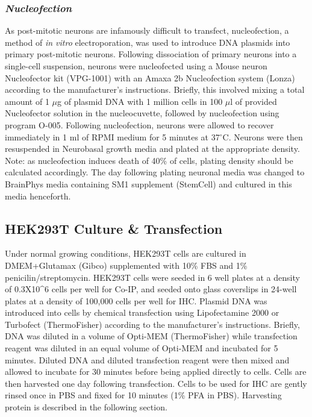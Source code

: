 \documentclass[onehalf,12pt]{beavtex}
\begin{document}
  \subsubsection*{\texorpdfstring{\emph{Nucleofection}}{Nucleofection}}\label{nucleofection}
  
  As post-mitotic neurons are infamously difficult to transfect,
  nucleofection, a method of \emph{in vitro} electroporation, was used to
  introduce DNA plasmids into primary post-mitotic neurons. Following
  dissociation of primary neurons into a single-cell suspension, neurons
  were nucleofected using a Mouse neuron Nucleofector kit (VPG-1001) with
  an Amaxa 2b Nucleofection system (Lonza) according to the manufacturer's
  instructions. Briefly, this involved mixing a total amount of 1 \(\mu\)g
  of plasmid DNA with 1 million cells in 100 \(\mu\)l of provided
  Nucleofector solution in the nucleocuvette, followed by nucleofection
  using program O-005. Following nucleofection, neurons were allowed to
  recover immediately in 1 ml of RPMI medium for 5 minutes at
  37\(^\circ\)C. Neurons were then resuspended in Neurobasal growth media
  and plated at the appropriate density. Note: as nucleofection induces
  death of 40\% of cells, plating density should be calculated
  accordingly. The day following plating neuronal media was changed to
  BrainPhys media containing SM1 supplement (StemCell) and cultured in
  this media henceforth.
  
  \subsection{HEK293T Culture \&
  Transfection}\label{hek293t-culture-transfection}
  
  Under normal growing conditions, HEK293T cells are cultured in
  DMEM+Glutamax (Gibco) supplemented with 10\% FBS and 1\%
  penicilin/streptomycin. HEK293T cells were seeded in 6 well plates at a
  density of 0.3X10\^{}6 cells per well for Co-IP, and seeded onto glass
  coverslips in 24-well plates at a density of 100,000 cells per well for
  IHC. Plasmid DNA was introduced into cells by chemical transfection
  using Lipofectamine 2000 or Turbofect (ThermoFisher) according to the
  manufacturer's instructions. Briefly, DNA was diluted in a volume of
  Opti-MEM (ThermoFisher) while transfection reagent was diluted in an
  equal volume of Opti-MEM and incubated for 5 minutes. Diluted DNA and
  diluted transfection reagent were then mixed and allowed to incubate for
  30 minutes before being applied directly to cells. Cells are then
  harvested one day following transfection. Cells to be used for IHC are
  gently rinsed once in PBS and fixed for 10 minutes (1\% PFA in PBS).
  Harvesting protein is described in the following section.
  
\end{document}
